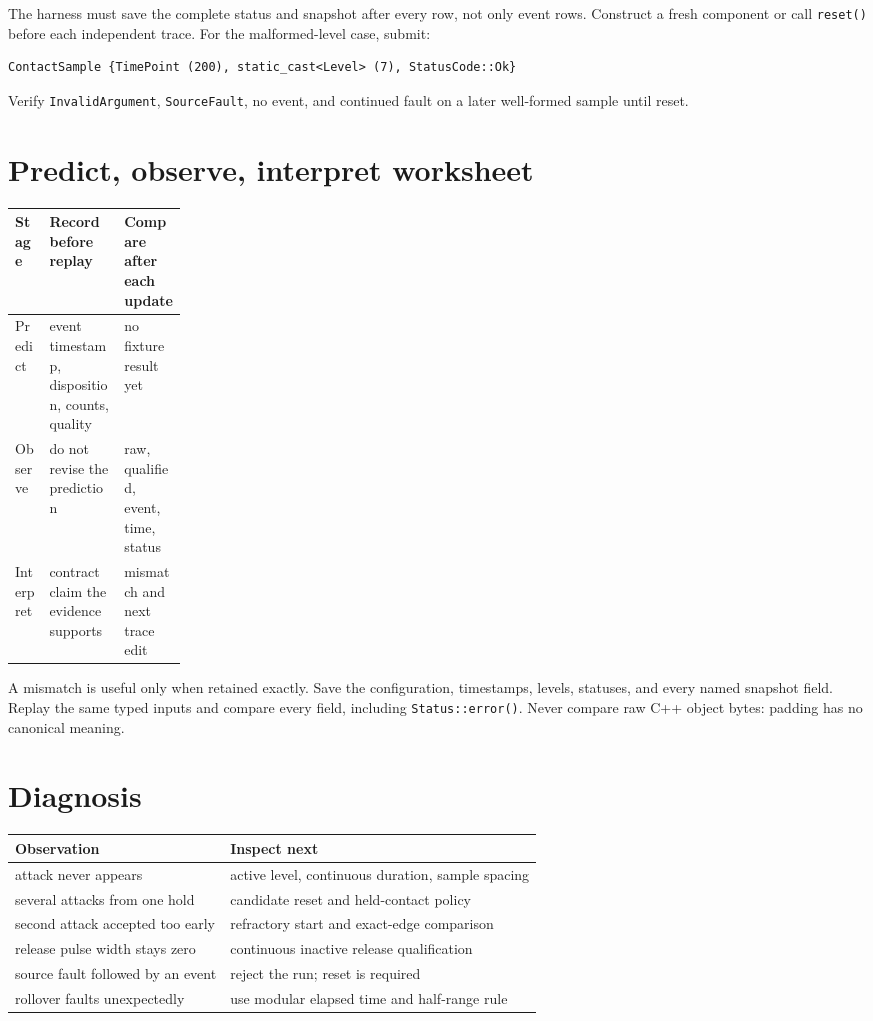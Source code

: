 \documentclass[11pt]{article}
\begin{document}
The harness must save the complete status and snapshot after every row, not
only event rows. Construct a fresh component or call \texttt{reset()} before
each independent trace. For the malformed-level case, submit:
\begin{lstlisting}[style=adkcpp]
ContactSample {TimePoint (200), static_cast<Level> (7), StatusCode::Ok}
\end{lstlisting}
Verify \texttt{InvalidArgument}, \texttt{SourceFault}, no event, and continued
fault on a later well-formed sample until reset.

\section{Predict, observe, interpret worksheet}
\begin{tabularx}{\linewidth}{@{}p{0.20\linewidth} X X@{}}
\toprule
Stage & Record before replay & Compare after each update\\
\midrule
Predict & event timestamp, disposition, counts, quality & no fixture result yet\\
Observe & do not revise the prediction & raw, qualified, event, time, status\\
Interpret & contract claim the evidence supports & mismatch and next trace edit\\
\bottomrule
\end{tabularx}

A mismatch is useful only when retained exactly. Save the configuration,
timestamps, levels, statuses, and every named snapshot field. Replay the same
typed inputs and compare every field, including \texttt{Status::error()}.
Never compare raw C++ object bytes: padding has no canonical meaning.

\section{Diagnosis}
\begin{tabularx}{\linewidth}{@{}X X@{}}
\toprule
Observation & Inspect next\\
\midrule
attack never appears & active level, continuous duration, sample spacing\\
several attacks from one hold & candidate reset and held-contact policy\\
second attack accepted too early & refractory start and exact-edge comparison\\
release pulse width stays zero & continuous inactive release qualification\\
source fault followed by an event & reject the run; reset is required\\
rollover faults unexpectedly & use modular elapsed time and half-range rule\\
\bottomrule
\end{tabularx}
\end{document}
